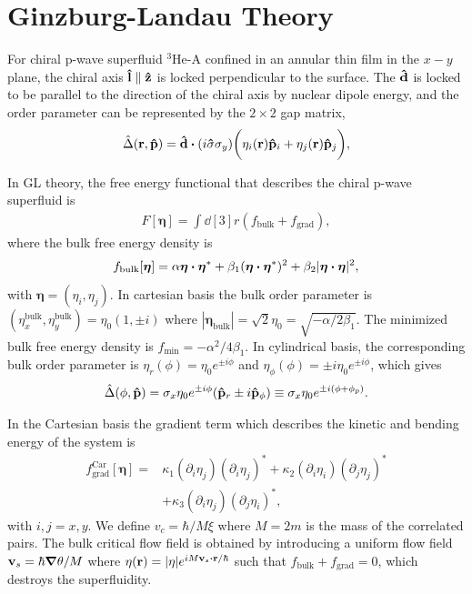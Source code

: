\documentclass[aps,prb,reprint,groupedaddress]{revtex4-2}
\begin{document}
\section{Ginzburg-Landau Theory}\label{sec:GL}

For chiral p-wave superfluid $^3$He-A confined in an annular thin film in the $x-y$
plane, the chiral axis $\vu{l}\parallel\vu{z}$ is locked perpendicular to the surface.
The $\vu{d}$ is locked to be parallel to the direction of the chiral axis by nuclear
dipole energy, and the order parameter can be represented by the $2\times 2$ gap matrix,
\begin{align}
    \hat{\Delta}(\vb{r},\vu{p})=\vu{d}\vdot(i\vu{\sigma}\sigma_y)
    \bigg(\eta_i(\vb{r})\vu{p}_i+\eta_j(\vb{r}) \vu{p}_j\bigg),
\end{align}

In GL theory, the free energy functional that describes the chiral p-wave superfluid is
\begin{align}
    F[\bm{\eta}]=\int\dd[3]r\left(f_{\text{bulk}}+f_{\text{grad}}\right),
\end{align}
where the bulk free energy density is
\begin{align}
    f_{\text{bulk}}[\bm{\eta}] = \alpha\bm{\eta}\vdot\bm{\eta}^*
    +\beta_1(\bm{\eta}\vdot\bm{\eta}^*)^2
    +\beta_2|\bm{\eta}\vdot\bm{\eta}|^2,
\end{align}
with $\bm{\eta}=(\eta_i,\eta_j)$. In cartesian basis the bulk order parameter is
$(\eta_x^\text{bulk},\eta_y^\text{bulk})=\eta_0(1,\pm i)$ where
$|\bm\eta_{\text{bulk}}|=\sqrt{2}\eta_0=\sqrt{-\alpha/2\beta_1}$. The minimized bulk free
energy density is $f_\text{min}=-\alpha^2/4\beta_1$.
In cylindrical basis, the corresponding bulk order parameter is
$\eta_r(\phi)=\eta_0e^{\pm i\phi}$
and $\eta_\phi(\phi)=\pm i\eta_0e^{\pm i\phi}$, which gives
\begin{align}
    \hat{\Delta}(\phi,\vu{p})=\sigma_x\eta_0e^{\pm i\phi}(\vu{p}_r\pm i\vu{p}_\phi)
    \equiv\sigma_x\eta_0e^{\pm i(\phi+\phi_p)}.
\end{align}

In the Cartesian basis the gradient term which describes
the kinetic and bending energy of the system is
\begin{align}\label{GL}
    f_{\text{grad}}^{\text{Car}}[\bm{\eta}]= & \kappa_1(\partial_i\eta_j)(\partial_i\eta_j)^*
    +\kappa_2(\partial_i\eta_i)(\partial_j\eta_j)^*\nonumber                                    \\
                                             & +\kappa_3(\partial_i\eta_j)(\partial_j\eta_i)^*,
\end{align}
with $i,j=x, y$. We define $v_c = \hbar/M\xi$ where $M=2m$ is the mass of the
correlated pairs. The bulk critical flow field
is obtained by introducing a uniform
flow field $\vb{v}_s=\hbar\grad\theta/M$ where
$\eta(\vb{r})=|\eta|e^{iM\vb{v}_s\vdot \vb{r}/\hbar}$ such that
$f_{\text{bulk}}+f_{\text{grad}}=0$, which destroys the superfluidity.
\end{document}
